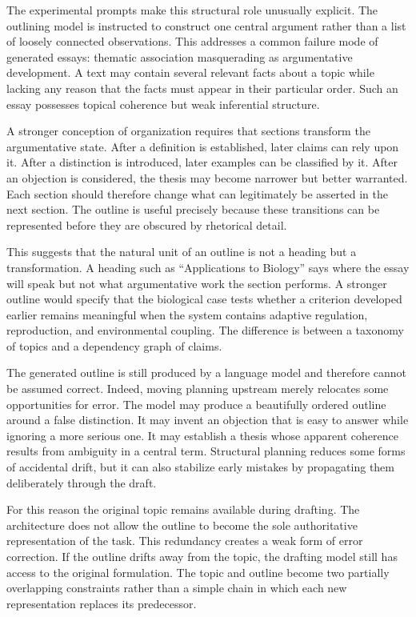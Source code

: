 \documentclass[11pt]{article}
\begin{document}
The experimental prompts make this structural role unusually explicit. The outlining model is instructed to construct one central argument rather than a list of loosely connected observations. This addresses a common failure mode of generated essays: thematic association masquerading as argumentative development. A text may contain several relevant facts about a topic while lacking any reason that the facts must appear in their particular order. Such an essay possesses topical coherence but weak inferential structure.

A stronger conception of organization requires that sections transform the argumentative state. After a definition is established, later claims can rely upon it. After a distinction is introduced, later examples can be classified by it. After an objection is considered, the thesis may become narrower but better warranted. Each section should therefore change what can legitimately be asserted in the next section. The outline is useful precisely because these transitions can be represented before they are obscured by rhetorical detail.

This suggests that the natural unit of an outline is not a heading but a transformation. A heading such as ``Applications to Biology'' says where the essay will speak but not what argumentative work the section performs. A stronger outline would specify that the biological case tests whether a criterion developed earlier remains meaningful when the system contains adaptive regulation, reproduction, and environmental coupling. The difference is between a taxonomy of topics and a dependency graph of claims.

The generated outline is still produced by a language model and therefore cannot be assumed correct. Indeed, moving planning upstream merely relocates some opportunities for error. The model may produce a beautifully ordered outline around a false distinction. It may invent an objection that is easy to answer while ignoring a more serious one. It may establish a thesis whose apparent coherence results from ambiguity in a central term. Structural planning reduces some forms of accidental drift, but it can also stabilize early mistakes by propagating them deliberately through the draft.

For this reason the original topic remains available during drafting. The architecture does not allow the outline to become the sole authoritative representation of the task. This redundancy creates a weak form of error correction. If the outline drifts away from the topic, the drafting model still has access to the original formulation. The topic and outline become two partially overlapping constraints rather than a simple chain in which each new representation replaces its predecessor.
\end{document}
